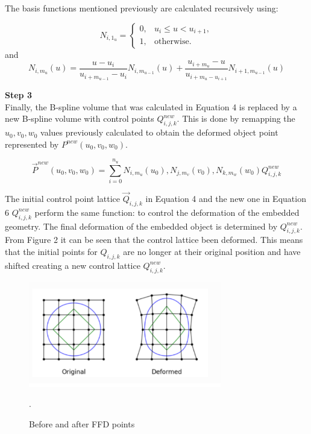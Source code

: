 \documentclass[12pt]{article}
\begin{document}
The basis functions mentioned previously are calculated recursively using: 

\begin{equation}
   N_{i,1_{u}} = \begin{cases}
0, & u_i \le u <u_{i+1},\\
1, & \text{otherwise}. 
\end{cases}
\end{equation}
and
$$N_{i,m_{u}}(u) = \frac{u -u_i}{u_{i+m_{u-1}}-u_i}N_{i,m_{u-1}}(u) + \frac{u_{i+m_{u}}-u}{u_{i+m_{u}-u_{i+1}}}N_{i+1,m_{u-1}}(u)$$

\noindent \textbf{Step 3}\\
Finally, the B-spline volume that was calculated in Equation 4 is replaced by a new B-spline volume with control points $Q_{i,j,k}^{new}$. This is done by remapping the $u_0, v_0, w_0$ values previously calculated to obtain the deformed object point represented by $P^{new}(u_0,v_0,w_0)$. \vspace{4mm}

\begin{equation}
    \overrightarrow{P}^{new}(u_0,v_0,w_0)= \sum_{i=0}^{n_u}N_{i,m_{u}}(u_0),N_{j,m_{v}}(v_0),N_{k,m_{w}}(w_0)Q_{i,j,k}^{new}
\end{equation}

\noindent The initial control point lattice $\overrightarrow{Q}_{i,j,k}$ in Equation 4  and the new one in Equation 6 $Q_{i,j,k}^{new}$ perform the same function: to control the deformation of the embedded geometry. The final deformation of the embedded object is determined by $Q_{i,j,k}^{new}$. From Figure 2 it can be seen that the control lattice been deformed. This means that the initial points for $Q_{i,j,k}$ are no longer at their original position and have shifted creating a new control lattice $Q_{i,j,k}^{new}$. 

\begin{figure}[ht]
    \centering
    \includegraphics[width=0.75\textwidth]{deformedFFD.PNG}
    \caption{Before and after FFD points \cite{machaeroffd}}.
    \label{fig:my_label}
\end{figure}
\end{document}
